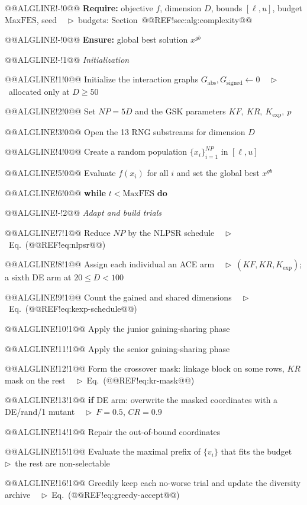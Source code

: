 \documentclass[10pt,a4paper]{article}
\begin{document}
@@ALGLINE!-!0@@ \textbf{Require:}  objective $f$, dimension $D$, bounds $[\ell,u]$, budget $\mathrm{MaxFES}$, seed \ \ $\triangleright$~budgets: Section~@@REF!sec:alg:complexity@@

@@ALGLINE!-!0@@ \textbf{Ensure:}  global best solution $x^{gb}$

@@ALGLINE!-!1@@ \emph{Initialization}

@@ALGLINE!1!0@@ Initialize the interaction graphs $G_{\mathrm{abs}}, G_{\mathrm{signed}} \gets 0$ \ \ $\triangleright$~allocated only at $D\ge50$

@@ALGLINE!2!0@@ Set $NP{=}5D$ and the GSK parameters $KF,\ KR,\ K_{\exp},\ p$

@@ALGLINE!3!0@@ Open the 13 RNG substreams for dimension $D$

@@ALGLINE!4!0@@ Create a random population $\{x_i\}_{i=1}^{NP}$ in $[\ell,u]$

@@ALGLINE!5!0@@ Evaluate $f(x_i)$ for all $i$ and set the global best $x^{gb}$

@@ALGLINE!6!0@@ \textbf{while} $t < \mathrm{MaxFES}$ \textbf{do}

@@ALGLINE!-!2@@ \quad\emph{Adapt and build trials}

@@ALGLINE!7!1@@ Reduce $NP$ by the NLPSR schedule \ \ $\triangleright$~Eq.~(@@REF!eq:nlpsr@@)

@@ALGLINE!8!1@@ Assign each individual an ACE arm \ \ $\triangleright$~$(KF, KR, K_{\exp})$; a sixth DE arm at $20{\le}D{<}100$

@@ALGLINE!9!1@@ Count the gained and shared dimensions \ \ $\triangleright$~Eq.~(@@REF!eq:kexp-schedule@@)

@@ALGLINE!10!1@@ Apply the junior gaining-sharing phase

@@ALGLINE!11!1@@ Apply the senior gaining-sharing phase

@@ALGLINE!12!1@@ Form the crossover mask: linkage block on some rows, $KR$ mask on the rest \ \ $\triangleright$~Eq.~(@@REF!eq:kr-mask@@)

@@ALGLINE!13!1@@ \textbf{if} DE arm: overwrite the masked coordinates with a DE/rand/1 mutant \ \ $\triangleright$~$F{=}0.5$, $CR{=}0.9$

@@ALGLINE!14!1@@ Repair the out-of-bound coordinates

@@ALGLINE!15!1@@ Evaluate the maximal prefix of $\{v_i\}$ that fits the budget \ \ $\triangleright$~the rest are non-selectable

@@ALGLINE!16!1@@ Greedily keep each no-worse trial and update the diversity archive \ \ $\triangleright$~Eq.~(@@REF!eq:greedy-accept@@)
\end{document}
